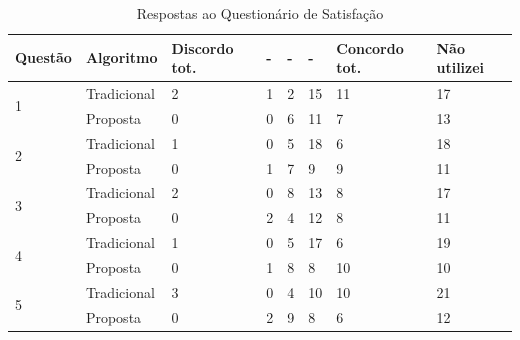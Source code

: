 \begin{table}[h]
\footnotesize
\caption{Respostas ao Questionário de Satisfação}
\label{tab:questionario-satisfacao-respostas}
\centering
\begin{tabular}{|p{1.5cm}|p{1.8cm}|p{2.2cm}|p{0.6cm}|p{0.6cm}|p{0.6cm}|p{2.3cm}|p{2cm}|}
\hline
\textbf{Questão} & \textbf{Algoritmo}   & \textbf{Discordo tot.} & \textbf{-} & \textbf{-} & \textbf{-} & \textbf{Concordo tot.} & \textbf{Não utilizei} \\
\hline
\multirow{2}{*}{1}          & Tradicional & 2                   & 1                     & 2                         & 15                    & 11                  & 17           \\
                            & Proposta    & 0                   & 0                     & 6                         & 11                    & 7                   & 13           \\
\hline
\multirow{2}{*}{2}          & Tradicional & 1                   & 0                     & 5                         & 18                    & 6                   & 18           \\
                            & Proposta    & 0                   & 1                     & 7                         & 9                     & 9                   & 11           \\
\hline
\multirow{2}{*}{3}          & Tradicional & 2                   & 0                     & 8                         & 13                    & 8                   & 17           \\
                            & Proposta    & 0                   & 2                     & 4                         & 12                    & 8                   & 11           \\
\hline
\multirow{2}{*}{4}          & Tradicional & 1                   & 0                     & 5                         & 17                    & 6                   & 19           \\
                            & Proposta    & 0                   & 1                     & 8                         & 8                     & 10                  & 10           \\
\hline
\multirow{2}{*}{5}          & Tradicional & 3                   & 0                     & 4                         & 10                    & 10                  & 21           \\
                            & Proposta    & 0                   & 2                     & 9                         & 8                     & 6                   & 12           \\

\end{tabular}
\end{table}
